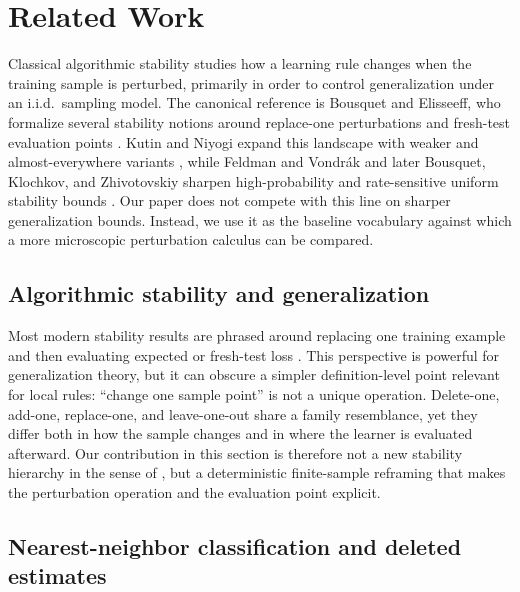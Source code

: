\section{Related Work}
\label{sec:related-work}

Classical algorithmic stability studies how a learning rule changes when the
training sample is perturbed, primarily in order to control generalization under
an i.i.d.\ sampling model.  The canonical reference is Bousquet and Elisseeff,
who formalize several stability notions around replace-one perturbations and
fresh-test evaluation points \cite{bousquet2002stability}.  Kutin and Niyogi
expand this landscape with weaker and almost-everywhere variants
\cite{kutin2002almost}, while Feldman and Vondr\'ak and later Bousquet,
Klochkov, and Zhivotovskiy sharpen high-probability and rate-sensitive uniform
stability bounds \cite{feldman2019high,bousquet2020sharpening}.  Our paper does
not compete with this line on sharper generalization bounds.  Instead, we use
it as the baseline vocabulary against which a more microscopic perturbation
calculus can be compared.

\subsection{Algorithmic stability and generalization}

Most modern stability results are phrased around replacing one training example
and then evaluating expected or fresh-test loss
\cite{bousquet2002stability,kutin2002almost,mukherjee2006learning}.  This
perspective is powerful for generalization theory, but it can obscure a simpler
definition-level point relevant for local rules: ``change one sample point'' is
not a unique operation.  Delete-one, add-one, replace-one, and leave-one-out
share a family resemblance, yet they differ both in how the sample changes and
in where the learner is evaluated afterward.  Our contribution in this section
is therefore not a new stability hierarchy in the sense of
\cite{bousquet2002stability}, but a deterministic finite-sample reframing that
makes the perturbation operation and the evaluation point explicit.

\subsection{Nearest-neighbor classification and deleted estimates}

